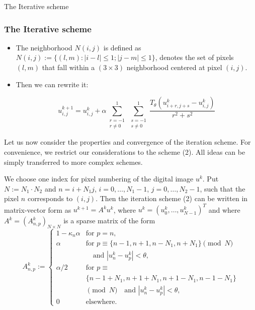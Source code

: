 \documentclass{beamer}
\begin{document}
\begin{frame}{The Iterative scheme}
\frametitle{The Iterative scheme}
    \begin{itemize}
       \item 	The neighborhood $ N(i, j)$ is defined as $N(i, j) := \{(l, m) : |i - l| \leq 1; |j - m| \leq 1\}
	$, denotes the set of pixels $(l, m)$ that fall within a $(3\times 3)$ neighborhood centered at pixel $(i, j)$.
	 \item Then we can rewrite it:

\begin{equation}
	u^{k+1}_{i, j} = u^k_{i, j} + \alpha \sum_{\substack{r=-1\\r\neq 0}}^{1}\sum_{\substack{s=-1\\s\neq 0}}^{1} \frac{T_{\theta}(u^k_{i+r,j+s} - u^k_{i, j})}{r^2 + s^2}  \label{eq:2}
\end{equation}

	
    \end{itemize}
\end{frame}
\begin{frame}[plain]
Let us now consider the properties and convergence of the iteration scheme. For convenience, we restrict our considerations to the scheme (2). All ideas can be simply transferred to more complex schemes.

We choose one index for pixel numbering of the digital image $u^k$. Put $N := N_1 \cdot N_2$ and
$n = i + N_1j$, $i = 0, \ldots, N_1 - 1$, $j = 0, \ldots, N_2 - 1$,
such that the pixel $n$ corresponds to $(i, j)$. Then the iteration scheme (2) can be written in matrix-vector form as
$u^{k+1} = A^k u^k$,
where $u^k = (u^k_0, \ldots, u^k_{N-1})^T$ and where $A^k = (A^k_{n,p})_{N \times N}$ is a sparse matrix of the form
\[
A^k_{n,p} :=
\begin{cases}
1 - \kappa_n \alpha & \text{for } p = n, \\
\alpha & \text{for } p \equiv \{n - 1, n + 1, n - N_1, n + N_1\} \pmod{N} \\
& \quad \text{and } |u^k_n - u^k_p| < \theta, \\
\alpha/2 & \text{for } p \equiv \\ & \{n - 1 + N_1, n + 1 + N_1, n + 1 - N_1, n-1-N_1\}\\& \pmod{N} 
 \quad \text{and } |u^k_n - u^k_p| < \theta, \\
0 & \text{elsewhere}.
\end{cases}
\]

\end{frame}
\end{document}
